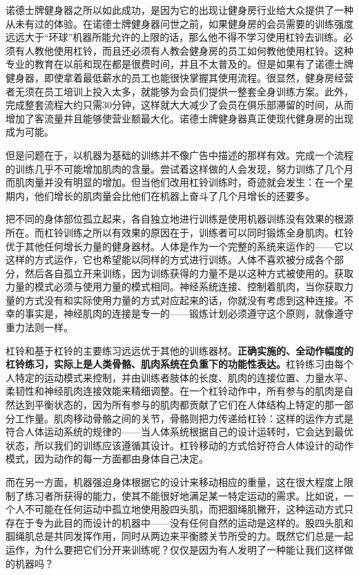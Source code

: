 诺德士牌健身器之所以如此成功，是因为它的出现让健身房行业给大众提供了一种从未有过的体验。在诺德士牌健身器问世之前，如果健身房的会员需要的训练强度远远大于“环球”机器所能允许的上限的话，那么他不得不学习使用杠铃去训练。必须有人教他使用杠铃，而且还必须有人教会健身房的员工如何教他使用杠铃。这种专业的教育在以前和现在都是很费时间，并且不太普及的。但是如果有了诺德士牌健身器，即使拿着最低薪水的员工也能很快掌握其使用流程。很显然，健身房经营者无须在员工培训上投入太多，就能够为会员们提供一整套全身训练方案。此外，完成整套流程大约只需30分钟，这样就大大减少了会员在俱乐部滞留的时间，从而增加了客流量并且能够使营业额最大化。诺德士牌健身器真正使现代健身房的出现成为可能。

但是问题在于，以机器为基础的训练并不像广告中描述的那样有效。完成一个流程的训练几乎不可能增加肌肉的含量。尝试着这样做的人会发现，努力训练了几个月而肌肉量并没有明显的增加。但当他们改用杠铃训练时，奇迹就会发生：在一个星期内，他们增长的肌肉量会比他们在机器上奋斗了几个月增长的还要多。

把不同的身体部位孤立起来，各自独立地进行训练是使用机器训练没有效果的根源所在。而杠铃训练之所以有效果的原因在于，训练者可以同时锻炼全身肌肉。杠铃优于其他任何增长力量的健身器材。人体是作为一个完整的系统来运作的——它以这样的方式运作，它也希望能以同样的方式进行训练。人体不喜欢被分成各个部分，然后各自孤立开来训练，因为训练获得的力量不是以这种方式被使用的。获取力量的模式必须与使用力量的模式相同。神经系统连接、控制着肌肉，当你获取力量的方式没有和实际使用力量的方式对应起来的话，你就没有考虑到这种连接。不幸的事实是，神经肌肉的连接是专一的——锻炼计划必须遵守这个原则，就像遵守重力法则一样。

杠铃和基于杠铃的主要练习远远优于其他的训练器材。\textbf{正确实施的、全动作幅度的杠铃练习，实际上是人类骨骼、肌肉系统在负重下的功能性表达。}杠铃练习由每个人特定的运动模式来控制，并由训练者肢体的长度、肌肉的连接位置、力量水平、柔韧性和神经肌肉连接效能来精细调整。在一个杠铃动作中，所有参与的肌肉是自然达到平衡状态的，因为所有参与的肌肉都贡献了它们在人体结构上特定的那一部分工作量。肌肉移动骨骼之间的关节，骨骼则把力传递给杠铃：这样的运作方式是符合人体运动系统的规律的——当人体系统根据自己的设计运转时，它会达到最优状态，所以我们的训练应该遵循其设计。杠铃移动的方式恰好符合人体设计的动作模式，因为动作的每一方面都由身体自己决定。

而在另一方面，机器强迫身体根据它的设计来移动相应的重量，这在很大程度上限制了练习者所获得的能力，使其不能很好地满足某一特定运动的需求。比如说，一个人不可能在任何运动中孤立地使用股四头肌，而把腘绳肌撇开，这种运动方式只存在于专为此目的而设计的机器中——没有任何自然的运动是这样的。股四头肌和腘绳肌总是共同发挥作用，同时从两边来平衡膝关节所受的力。既然它们总是一起运作，为什么要把它们分开来训练呢？仅仅是因为有人发明了一种能让我们这样做的机器吗？

